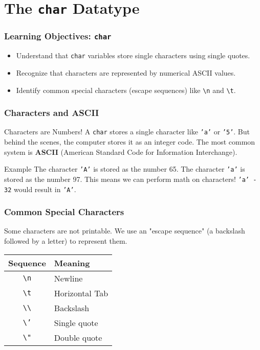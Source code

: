 \documentclass{beamer}
\begin{document}
\section{The \texttt{char} Datatype}

\begin{frame}
\frametitle{Learning Objectives: \texttt{char}}
\begin{itemize}
    \item Understand that \texttt{char} variables store single characters using single quotes.
    \item Recognize that characters are represented by numerical ASCII values.
    \item Identify common special characters (escape sequences) like \texttt{\textbackslash n} and \texttt{\textbackslash t}.
\end{itemize}
\end{frame}

\begin{frame}
\frametitle{Characters and ASCII}
\begin{alertblock}{Characters are Numbers!}
A \texttt{char} stores a single character like \texttt{'a'} or \texttt{'5'}. But behind the scenes, the computer stores it as an integer code. The most common system is \textbf{ASCII} (American Standard Code for Information Interchange).
\end{alertblock}
\begin{exampleblock}{Example}
The character \texttt{'A'} is stored as the number 65.
\newline
The character \texttt{'a'} is stored as the number 97.
\newline
This means we can perform math on characters! \texttt{'a' - 32} would result in \texttt{'A'}.
\end{exampleblock}
\end{frame}

\begin{frame}
\frametitle{Common Special Characters}
Some characters are not printable. We use an "escape sequence" (a backslash followed by a letter) to represent them.
\begin{center}
\begin{tabular}{|c|l|}
\hline
\textbf{Sequence} & \textbf{Meaning} \\ \hline
\texttt{\textbackslash n} & Newline \\
\texttt{\textbackslash t} & Horizontal Tab \\
\texttt{\textbackslash\textbackslash} & Backslash \\
\texttt{\textbackslash'} & Single quote \\
\texttt{\textbackslash"} & Double quote \\ \hline
\end{tabular}
\end{center}
\end{frame}
\end{document}
